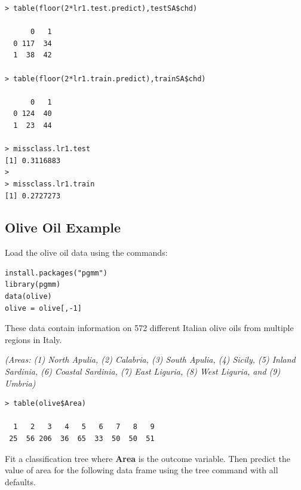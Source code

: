 \documentclass[caret-main.tex]{subfiles}
\begin{document}
\begin{verbatim}
> table(floor(2*lr1.test.predict),testSA$chd)
   
      0   1
  0 117  34
  1  38  42

> table(floor(2*lr1.train.predict),trainSA$chd)
   
      0   1
  0 124  40
  1  23  44

> missclass.lr1.test
[1] 0.3116883
> 
> missclass.lr1.train
[1] 0.2727273
\end{verbatim}
\newpage
\subsection{Olive Oil Example}

Load the olive oil data using the commands:
\begin{framed}
\begin{verbatim}
install.packages("pgmm")
library(pgmm)
data(olive)
olive = olive[,-1]
\end{verbatim}
\end{framed}
\noindent These data contain information on 572 different Italian olive oils from multiple regions in Italy. 

\noindent \textit{(Areas: (1) North Apulia, (2) Calabria, (3) South Apulia, (4) Sicily, (5) Inland Sardinia, (6) Coastal Sardinia, (7) East Liguria, (8) West Liguria, and (9) Umbria)}
\begin{verbatim}
> table(olive$Area)

  1   2   3   4   5   6   7   8   9 
 25  56 206  36  65  33  50  50  51
\end{verbatim}
\noindent Fit a classification tree where \textbf{Area} is the outcome variable.
Then predict the value of area for the following data frame using the tree
command with all defaults.
\end{document}

